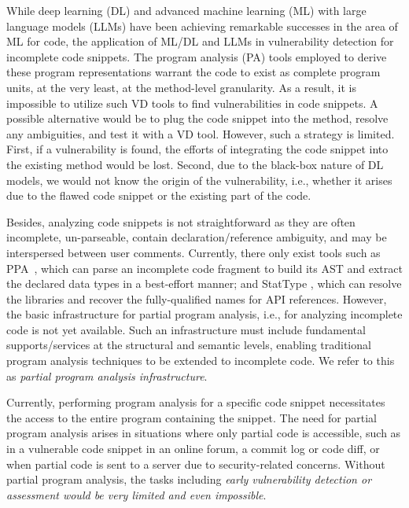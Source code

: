 While deep learning (DL) and advanced machine learning (ML) with large
language models (LLMs) have been achieving remarkable successes in the
area of ML for code, the application of ML/DL and LLMs in
vulnerability detection for incomplete code snippets. The program
analysis (PA) tools employed to derive these program representations
warrant the code to exist as complete program units, at the very
least, at the method-level granularity. As a result, it is impossible
to utilize such VD tools to find vulnerabilities in code snippets. A
possible alternative would be to plug the code snippet into the
method, resolve any ambiguities, and test it with a VD tool. However,
such a strategy is limited. First, if a vulnerability is found, the
efforts of integrating the code snippet into the existing method would
be lost. Second, due to the black-box nature of DL models, we would
not know the origin of the vulnerability, i.e., whether it arises due
to the flawed code snippet or the existing part of the code.

Besides, analyzing code snippets is not straightforward as they are often incomplete, un-parseable, contain declaration/reference ambiguity, and may be interspersed between user comments. Currently, there only exist tools such as PPA~\cite{ppa08}, which can parse an incomplete code fragment to build its AST and extract the declared data types in a best-effort manner; and StatType \cite{icse18}, which can resolve the libraries and recover the fully-qualified names for API references. However, the basic infrastructure for partial program analysis, i.e., for analyzing incomplete code is not yet available. Such an infrastructure must include fundamental supports/services at the structural and semantic levels, enabling traditional program analysis techniques to be extended to incomplete code. We refer to this as \textit{partial program analysis infrastructure}.


Currently, performing program analysis for a specific code snippet
necessitates the access to the entire program containing the
snippet. The need for partial program analysis arises in situations
where only partial code is accessible, such as in a vulnerable code
snippet in an online forum, a commit log or code diff, or when partial
code is sent to a server due to security-related concerns. Without
partial program analysis, the tasks including {\em early vulnerability
detection or assessment would be very limited and even impossible}.

